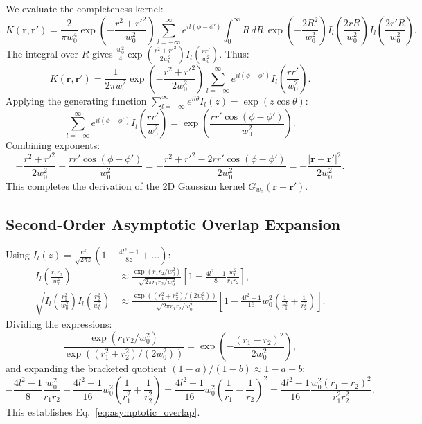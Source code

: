 \documentclass[11pt,a4paper]{article}
\begin{document}
We evaluate the completeness kernel:
\begin{equation}
K(\mathbf{r}, \mathbf{r}') = \frac{2}{\pi w_0^4} \exp\left( - \frac{r^2 + r'^2}{w_0^2} \right) \sum_{l=-\infty}^\infty e^{i l(\phi - \phi')} \int_0^\infty R \, dR \, \exp\left( - \frac{2 R^2}{w_0^2} \right) I_l\left( \frac{2 r R}{w_0^2} \right) I_l\left( \frac{2 r' R}{w_0^2} \right).
\end{equation}
The integral over $R$ gives $\frac{w_0^2}{4} \exp(\frac{r^2 + r'^2}{2 w_0^2}) I_l(\frac{r r'}{w_0^2})$. Thus:
\begin{equation}
K(\mathbf{r}, \mathbf{r}') = \frac{1}{2\pi w_0^2} \exp\left( - \frac{r^2 + r'^2}{2 w_0^2} \right) \sum_{l=-\infty}^\infty e^{i l(\phi - \phi')} I_l\left( \frac{r r'}{w_0^2} \right).
\end{equation}
Applying the generating function $\sum_{l=-\infty}^\infty e^{i l \theta} I_l(z) = \exp(z \cos \theta)$:
\begin{equation}
\sum_{l=-\infty}^\infty e^{i l(\phi - \phi')} I_l\left( \frac{r r'}{w_0^2} \right) = \exp\left( \frac{r r' \cos(\phi - \phi')}{w_0^2} \right).
\end{equation}
Combining exponents:
\begin{equation}
- \frac{r^2 + r'^2}{2 w_0^2} + \frac{r r' \cos(\phi - \phi')}{w_0^2} = - \frac{r^2 + r'^2 - 2 r r' \cos(\phi - \phi')}{2 w_0^2} = - \frac{|\mathbf{r} - \mathbf{r}'|^2}{2 w_0^2}.
\end{equation}
This completes the derivation of the 2D Gaussian kernel $G_{w_0}(\mathbf{r} - \mathbf{r}')$.

\subsection{Second-Order Asymptotic Overlap Expansion}

Using $I_l(z) = \frac{e^z}{\sqrt{2\pi z}} (1 - \frac{4l^2 - 1}{8z} + \dots)$:
\begin{align}
I_l\left( \frac{r_1 r_2}{w_0^2} \right) &\approx \frac{\exp(r_1 r_2 / w_0^2)}{\sqrt{2\pi r_1 r_2 / w_0^2}} \left[ 1 - \frac{4l^2 - 1}{8} \frac{w_0^2}{r_1 r_2} \right], \\
\sqrt{I_l\left( \frac{r_1^2}{w_0^2} \right) I_l\left( \frac{r_2^2}{w_0^2} \right)} &\approx \frac{\exp((r_1^2 + r_2^2) / (2 w_0^2))}{\sqrt{2\pi r_1 r_2 / w_0^2}} \left[ 1 - \frac{4l^2 - 1}{16} w_0^2 \left( \frac{1}{r_1^2} + \frac{1}{r_2^2} \right) \right].
\end{align}
Dividing the expressions:
\begin{equation}
\frac{\exp(r_1 r_2 / w_0^2)}{\exp((r_1^2 + r_2^2) / (2 w_0^2))} = \exp\left( - \frac{(r_1 - r_2)^2}{2 w_0^2} \right),
\end{equation}
and expanding the bracketed quotient $(1 - a)/(1 - b) \approx 1 - a + b$:
\begin{equation}
- \frac{4l^2 - 1}{8} \frac{w_0^2}{r_1 r_2} + \frac{4l^2 - 1}{16} w_0^2 \left( \frac{1}{r_1^2} + \frac{1}{r_2^2} \right) = \frac{4l^2 - 1}{16} w_0^2 \left( \frac{1}{r_1} - \frac{1}{r_2} \right)^2 = \frac{4l^2 - 1}{16} \frac{w_0^2 (r_1 - r_2)^2}{r_1^2 r_2^2}.
\end{equation}
This establishes Eq.~\eqref{eq:asymptotic_overlap}.



\end{document}
